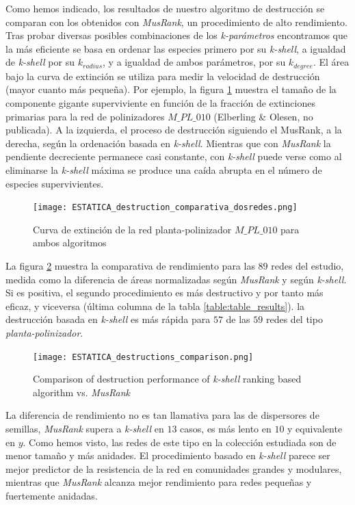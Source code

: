 Como hemos indicado, los resultados de nuestro algoritmo de destrucción se comparan con los obtenidos con \textit{MusRank}, un procedimiento de alto rendimiento. Tras probar diversas posibles combinaciones de los \textit{k-parámetros} encontramos que la más eficiente se basa en ordenar las especies primero por su \textit{k-shell}, a igualdad de  \textit{k-shell} por su $k_{radius}$, y a igualdad de ambos parámetros, por su $k_{degree}$. El área bajo la curva de extinción se utiliza para medir la velocidad de destrucción (mayor cuanto más pequeña). Por ejemplo, la figura \ref{fig:ESTATICA_destruction_comparativa_dosredes} muestra el tamaño de la componente gigante superviviente en función de la fracción de extinciones primarias para la red de polinizadores $M\_PL\_010$ (Elberling \& Olesen, no publicada). A la izquierda, el proceso de destrucción siguiendo el {MusRank}, a la derecha, según la ordenación basada en \textit{k-shell}. Mientras que con \textit{MusRank} la pendiente decreciente permanece casi constante, con \textit{k-shell} puede verse como al eliminarse la \textit{k-shell} máxima se produce una caída abrupta en el número de especies supervivientes.

\begin{figure}[h!]
\centering
\texttt{[image: ESTATICA\_destruction\_comparativa\_dosredes.png]}
\caption {Curva de extinción de la red planta-polinizador $M\_PL\_010$ para ambos algoritmos}
\label{fig:ESTATICA_destruction_comparativa_dosredes}
\end{figure}

La figura \ref{fig:ESTATICA_destructions_comparison} muestra la comparativa de rendimiento para las $89$ redes del estudio, medida como la diferencia de áreas normalizadas según \textit{MusRank} y según \textit{k-shell}. Si es positiva, el segundo procedimiento es más destructivo y por tanto más eficaz, y viceversa (última columna de la tabla \ref{table:table_results}). la destrucción basada en \textit{k-shell} es más rápida para $57$ de las $59$ redes del tipo \textit{planta-polinizador}. 

\begin{figure}[h!]
\centering
\texttt{[image: ESTATICA\_destructions\_comparison.png]}
\caption {Comparison of destruction performance of \textit{k-shell} ranking based algorithm vs. \textit{MusRank}}
\label{fig:ESTATICA_destructions_comparison}
\end{figure}

La diferencia de rendimiento no es tan llamativa para las de dispersores de semillas, \textit{MusRank} supera a \textit{k-shell} en $13$ casos, es más lento en $10$ y equivalente en $y$. Como hemos visto, las redes de este tipo en la colección estudiada son de menor tamaño y más anidades. El procedimiento basado en \textit{k-shell} parece ser mejor predictor de la resistencia de la red en comunidades grandes y modulares, mientras que \textit{MusRank} alcanza mejor rendimiento para redes pequeñas y fuertemente anidadas.

